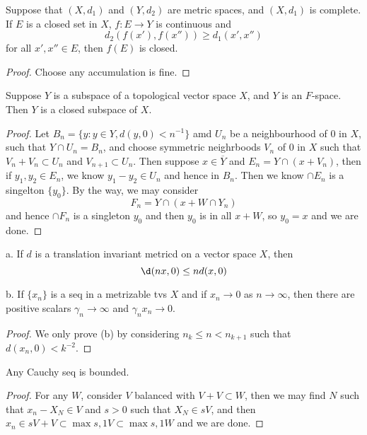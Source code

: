 \documentclass[lang=en, color=blue, ]{elegantbook}
\begin{document}
\begin{theorem}
    Suppose that $(X,d_1)$ and $(Y,d_2)$ are metric spaces, and $(X,d_1)$ is complete. If $E$ is a closed set in $X$, $f:E\to Y$ is continuous and
    \[d_2(f(x'),f(x'')) \geq d_1(x',x'')\]
    for all $x',x'' \in E$, then $f(E)$ is closed.
\end{theorem}
\begin{proof}
    Choose any accumulation is fine.
\end{proof}

\begin{theorem}
    Suppose $Y$ is a subspace of a topological vector space $X$, and $Y$ is an $F$-space. Then $Y$ is a closed subspace of $X$.
\end{theorem}
\begin{proof}
    Let $B_n = \{y:y\in Y, d(y,0) < n^{-1}\}$ amd $U_n$ be a neighbourhood of $0$ in $X$, such that $Y\cap U_n = B_{n}$, and choose symmetric neighrboods $V_n$ of $0$ in $X$ such that $V_n+V_n\subset U_n$ and $V_{n+1}\subset U_{n}$. Then suppose $x\in\overline{Y}$ and $E_n  =Y\cap(x+V_n)$, then if $y_1,y_2\in E_n$, we know $y_1 - y_2 \in U_n$ and hence in $B_{n}$. Then we know $\cap E_n$ is a singelton $\{y_0\}$. By the way, we may consider
    \[F_n = Y\cap (x+W\cap Y_n)\]
    and hence $\cap F_n$ is a singleton $y_0$ and then $y_0$ is in all $x+W$, so $y_0  = x$ and we are done.
\end{proof}

\begin{theorem}
    a. If $d$ is a translation invariant metricd on a vector space $X$, then
    \[\d(nx,0) \leq nd(x,0)\]\par
    b. If $\{x_n\}$ is a seq in a metrizable tvs $X$ and if $x_n \to 0$ as $n\to\infty$, then there are positive scalars $\gamma_n \to \infty$ and $\gamma_n x_n \to 0$.
\end{theorem}
\begin{proof}
    We only prove (b) by considering $n_k \leq n < n_{k+1}$ such that $d(x_{n}, 0) < k^{-2}$.
\end{proof}

\begin{proposition}
    Any Cauchy seq is bounded.
\end{proposition}
\begin{proof}
    For any $W$, consider $V$ balanced with $V+V\subset W$, then we may find $N$ such that $x_n - X_N \in V$ and $s>0$ such that $X_N \in sV$, and then $x_n \in sV + V \subset \max{s,1}V \subset \max{s,1}W$ and we are done.
\end{proof}
\end{document}
